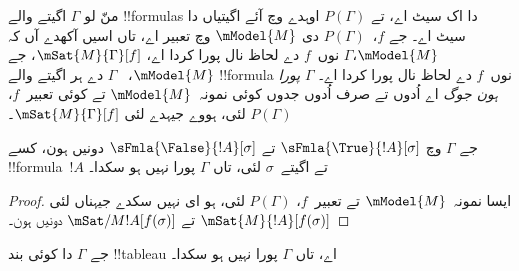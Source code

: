 \documentclass[../../../include/open-logic-section]{subfiles}
\begin{document}
\begin{defn}
  منّ لو $\Gamma$ اگیتے والے !!{formula}s دا اک سیٹ اے، تے $P(\Gamma)$
  اوہدے وچ آئے اگیتیاں دا سیٹ اے۔ جے $f$،~$P(\Gamma)$ دی $\mModel{M}$
  وچ تعبیر اے، تاں اسیں آکھدے آں کہ $\mModel{M}$،$\Gamma$ نوں~$f$ دے لحاظ نال پورا کردا اے، $\mSat{M}{\Gamma}[f]$، جے $\mModel{M}$،
  ~$\Gamma$ دے ہر اگیتے والے !!{formula} نوں~$f$ دے لحاظ نال پورا کردا اے۔
  $\Gamma$ \emph{پورا ہون جوگ} اے اُدوں تے صرف اُدوں جدوں کوئی
  نمونہ~$\mModel{M}$ تے کوئی تعبیر~$f$، $P(\Gamma)$ لئی، ہووے جیہدے لئی
  $\mSat{M}{\Gamma}[f]$۔
\end{defn}

\begin{prop}
  جے $\Gamma$ وچ $\sFmla{\True}{!A}[\sigma]$ تے
  $\sFmla{\False}{!A}[\sigma]$ دونیں ہون، کسے !!{formula}~$!A$ تے
  اگیتے~$\sigma$ لئی، تاں $\Gamma$ پورا نہیں ہو سکدا۔
\end{prop}

\begin{proof}
  ایسا نمونہ~$\mModel{M}$ تے تعبیر~$f$، $P(\Gamma)$ لئی، ہو ای نہیں سکدے
  جیہناں لئی $\mSat{M}{!A}[f(\sigma)]$ تے
  $\mSat/{M}{!A}[f(\sigma)]$ دونیں ہون۔
\end{proof}

\begin{thm}
  جے $\Gamma$ دا کوئی بند !!{tableau} اے، تاں $\Gamma$ پورا نہیں ہو سکدا۔
\end{thm}
\end{document}
